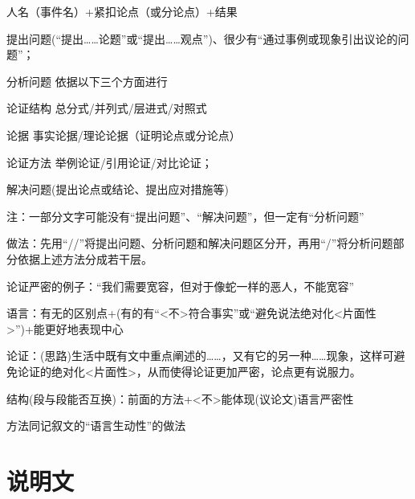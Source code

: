 人名（事件名）+紧扣论点（或分论点）+结果

\begin{asparaenum}[(1)]
\item 提出问题(``提出\ldots{}\ldots{}论题''或``提出\ldots{}\ldots{}观点'')、很少有``通过事例或现象引出议论的问题''；
\item 分析问题
依据以下三个方面进行
\begin{compactdesc}
\item[论证结构]总分式/并列式/层进式/对照式
\item[论据]事实论据/理论论据（证明论点或分论点）
\item[论证方法]举例论证/引用论证/对比论证；
\end{compactdesc}
\item 解决问题(提出论点或结论、提出应对措施等)
\end{asparaenum}
注：一部分文字可能没有``提出问题''、``解决问题''，但一定有``分析问题''\par
做法：先用``//''将提出问题、分析问题和解决问题区分开，再用``/''将分析问题部分依据上述方法分成若干层。

论证严密的例子：“我们需要宽容，但对于像蛇一样的恶人，不能宽容”
\begin{asparaenum}[(1)]
\item 语言：有无的区别点+(有的有``<不>符合事实''或``避免说法绝对化<片面性>'')+能更好地表现中心
\item 论证：(思路)生活中既有文中重点阐述的\ldots{}\ldots{}，又有它的另一种\ldots{}\ldots{}现象，这样可避免论证的绝对化\mbox{<片面性>}，从而使得论证更加严密，论点更有说服力。
\item 结构(段与段能否互换)：前面的方法+<不>能体现(议论文)语言严密性
\end{asparaenum}

  方法同记叙文的``语言生动性''的做法

\section{说明文}

